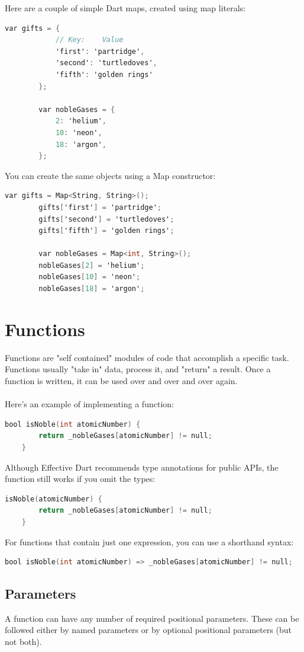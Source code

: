 \begin{itemize}
	Here are a couple of simple Dart maps, created using map literals:
	
	\begin{lstlisting}[language=C]
		var gifts = {
			// Key:    Value
			'first': 'partridge',
			'second': 'turtledoves',
			'fifth': 'golden rings'
		};
		
		var nobleGases = {
			2: 'helium',
			10: 'neon',
			18: 'argon',
		};
	\end{lstlisting}
	You can create the same objects using a Map constructor:
	\begin{lstlisting}[language=C]
		var gifts = Map<String, String>();
		gifts['first'] = 'partridge';
		gifts['second'] = 'turtledoves';
		gifts['fifth'] = 'golden rings';
		
		var nobleGases = Map<int, String>();
		nobleGases[2] = 'helium';
		nobleGases[10] = 'neon';
		nobleGases[18] = 'argon';
	\end{lstlisting}
\end{itemize}
\section{Functions}

Functions are "self contained" modules of code that accomplish a specific task. Functions usually "take in" data, process it, and "return" a result. Once a function is written, it can be used over and over and over again.\\\\

Here's an example of implementing a function:
\begin{lstlisting}[language=C]
	bool isNoble(int atomicNumber) {
		return _nobleGases[atomicNumber] != null;
	}
\end{lstlisting}
Although Effective Dart recommends type annotations for public APIs, the function still works if you omit the types:

\begin{lstlisting}[language=C]
	isNoble(atomicNumber) {
		return _nobleGases[atomicNumber] != null;
	}
\end{lstlisting}
For functions that contain just one expression, you can use a shorthand syntax:

\begin{lstlisting}[language=C]
	bool isNoble(int atomicNumber) => _nobleGases[atomicNumber] != null;
\end{lstlisting}
\subsection{Parameters}
A function can have any number of required positional parameters. These can be followed either by named parameters or by optional positional parameters (but not both).
